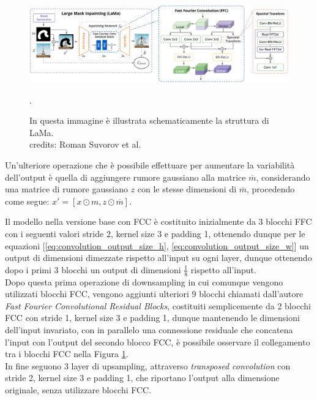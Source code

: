 \begin{figure}[H]
    \centering
    \includegraphics[width=1.0\textwidth]{imgs/lama_model.png}
    \caption{In questa immagine è illustrata schematicamente la struttura di LaMa.\\
        credits: Roman Suvorov et al. \cite{suvorov2021resolutionrobust}}.
    \label{fig:lama_architecture}
\end{figure}

Un'ulteriore operazione che è possibile effettuare per aumentare la variabilità dell'output è quella di aggiungere rumore gaussiano alla matrice
$\overline{m}$, considerando una matrice di rumore gaussiano $z$ con le stesse dimensioni di $\overline{m}$, procedendo come segue:
$ x' = [x \odot m, z \odot \overline{m}]$.


Il modello nella versione base con FCC è costituito inizialmente da 3 blocchi FFC con i seguenti valori stride 2, kernel size 3 e padding 1,
ottenendo dunque per le equazioni [\ref{eq:convolution_output_size_h}, \ref{eq:convolution_output_size_w}] un output di dimensioni dimezzate rispetto all'input
su ogni layer, dunque ottenendo dopo i primi 3 blocchi un output di dimensioni $\frac{1}{8}$ rispetto all'input.\\
Dopo questa prima operazione di downsampling in cui comunque vengono utilizzati blocchi FCC, vengono aggiunti ulteriori 9 blocchi
chiamati dall'autore \textit{Fast Fourier Convolutional Residual Blocks}, costituiti semplicemente da 2 blocchi FCC con stride 1, kernel size 3 e padding 1,
dunque mantenendo le dimensioni dell'input invariato, con in parallelo una connessione residuale che concatena l'input con l'output del secondo blocco FCC,
è possibile osservare il collegamento tra i blocchi FCC nella Figura \ref{fig:lama_architecture}.\\
In fine seguono 3 layer di upsampling, attraverso \textit{transposed convolution} con stride 2, kernel size 3 e padding 1, che riportano l'output alla 
dimensione originale, senza utilizzare blocchi FCC.

